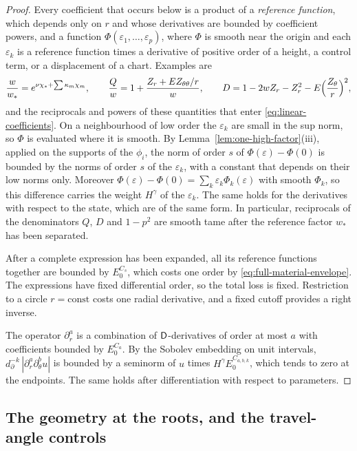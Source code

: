 \begin{proof}
Every coefficient that occurs below is a product of a \emph{reference
function}, which depends only on $r$ and whose derivatives are
bounded by coefficient powers, and a function
$\Phi(\varepsilon_1,\ldots,\varepsilon_p)$, where $\Phi$ is smooth
near the origin and each $\varepsilon_k$ is a reference function
times a derivative of positive order of a height, a control term, or
a displacement of a chart. Examples are
\[
 \frac w{w_*}=e^{\nu\chi_*+\sum\kappa_m\chi_m},\qquad
 \frac Qw=1+\frac{Z_r+EZ_{\theta\theta}/r}{w},\qquad
 D=1-2wZ_r-Z_r^2-E\Bigl(\frac{Z_\theta}r\Bigr)^2,
\]
and the reciprocals and powers of these quantities that enter
\eqref{eq:linear-coefficients}. On a neighbourhood of low order the
$\varepsilon_k$ are small in the sup norm, so $\Phi$ is evaluated
where it is smooth. By Lemma~\ref{lem:one-high-factor}(iii), applied
on the supports of the $\phi_i$, the norm of order $s$ of
$\Phi(\varepsilon)-\Phi(0)$ is bounded by the norms of order $s$ of
the $\varepsilon_k$, with a constant that depends on their low norms
only. Moreover
$\Phi(\varepsilon)-\Phi(0)=\sum_k\varepsilon_k\Phi_k(\varepsilon)$
with smooth $\Phi_k$, so this difference carries the weight
$H^\gamma$ of the $\varepsilon_k$. The same holds for the derivatives
with respect to the state, which are of the same form. In
particular, reciprocals of the denominators $Q$, $D$ and $1-p^2$ are
smooth tame after the reference factor $w_*$ has been separated.

After a complete expression has been expanded, all its reference
functions together are bounded by $E_0^{C_s}$, which costs one order
by \eqref{eq:full-material-envelope}. The expressions have fixed
differential order, so the total loss is fixed. Restriction to a
circle $r=\text{const}$ costs one radial derivative, and a fixed
cutoff provides a right inverse.

The operator $\partial_r^a$ is a combination of $\mathsf D$-derivatives of
order at most $a$ with coefficients bounded by $E_0^{C_a}$. By the
Sobolev embedding on unit intervals,
$d_\partial^{-k}\,|\partial_r^a\partial_\theta^bu|$ is bounded by a
seminorm of $u$ times $H^\gamma E_0^{C_{a,b,k}}$, which tends to zero
at the endpoints. The same holds after differentiation with respect to
parameters.
\end{proof}

\subsection{The geometry at the roots, and the travel-angle controls}
\label{subsec:root-geometry}

